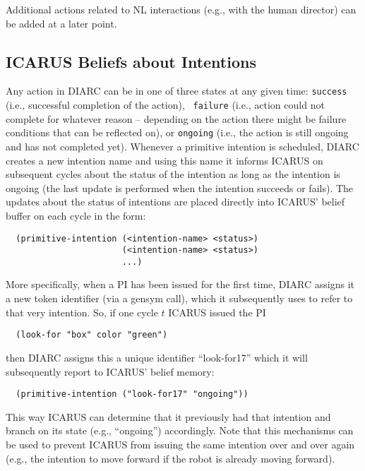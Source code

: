 \documentclass{article}
\begin{document}
Additional actions related to NL interactions (e.g., with the human
director) can be added at a later point.

\subsection*{ICARUS Beliefs about Intentions}

Any action in DIARC can be in one of three states at any given time:
{\tt success} (i.e., successful completion of the action), {\tt
  failure} (i.e., action could not complete for whatever reason --
depending on the action there might be failure conditions that can be
reflected on), or {\tt ongoing} (i.e., the action is still ongoing and
has not completed yet).  Whenever a primitive intention is scheduled,
DIARC creates a new intention name and using this name it informs
ICARUS on subsequent cycles about the status of the intention as long
as the intention is ongoing (the last update is performed when the
intention succeeds or fails).  The updates about the status of
intentions are placed directly into ICARUS' belief buffer on each
cycle in the form:

\begin{verbatim}
  (primitive-intention (<intention-name> <status>)
                       (<intention-name> <status>)
                       ...)
\end{verbatim}

More specifically, when a PI has been issued for the first time, DIARC
assigns it a new token identifier (via a gensym call), which it
subsequently uses to refer to that very intention.  So, if one cycle
$t$ ICARUS issued the PI

\begin{verbatim}
  (look-for "box" color "green")
\end{verbatim}

then DIARC assigns this a unique identifier ``look-for17'' which it 
will subsequently report to ICARUS' belief memory:

\begin{verbatim}
  (primitive-intention ("look-for17" "ongoing"))
\end{verbatim}

This way ICARUS can determine that it previously had that intention
and branch on its state (e.g., ``ongoing'') accordingly.  Note that
this mechanisms can be used to prevent ICARUS from issuing the same
intention over and over again (e.g., the intention to move forward if
the robot is already moving forward).
\end{document}
